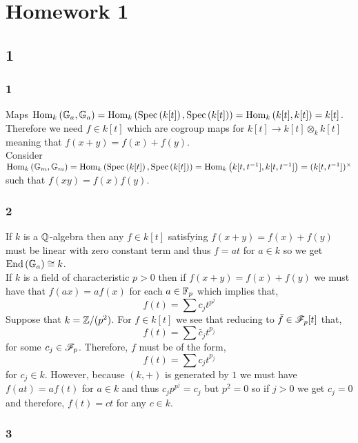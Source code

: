 \documentclass[12pt]{article}
\begin{document}
\section{Homework 1}

\tableofcontents

\subsection{1}

\subsubsection{1}

Maps $\mathrm{Hom}_{k} \left( \mathbb{G}_a, \mathbb{G}_a \right) = \mathrm{Hom}_{k} \left( \mathrm{Spec}\left( k[t] \right), \mathrm{Spec}\left( k[t] \right) \right) = \mathrm{Hom}_{k} \left( k[t], k[t] \right) = k[t]$. Therefore we need $f \in k[t]$ which are cogroup maps for $k[t] \to k[t] \otimes_k k[t]$ meaning that $f(x + y) = f(x) + f(y)$. 
\bigskip\\
Consider $\mathrm{Hom}_{k} \left( \mathbb{G}_m, \mathbb{G}_m \right) = \mathrm{Hom}_{k} \left( \mathrm{Spec}\left( k[t] \right), \mathrm{Spec}\left( k[t] \right) \right) = \mathrm{Hom}_{k} \left( k[t,t^{-1}], k[t,t^{-1}] \right) = (k[t, t^{-1}])^\times$ such that $f(xy) = f(x) f(y)$.

\subsubsection{2}

If $k$ is a $\mathbb{Q}$-algebra then any $f \in k[t]$ satisfying $f(x + y) = f(x) + f(y)$ must be linear with zero constant term and thus $f = a t$ for $a \in k$ so we get $\mathrm{End}\left( \mathbb{G}_a \right) \cong k$. 
\bigskip\\
If $k$ is a field of characteristic $p > 0$ then if $f(x+y) = f(x) + f(y)$ we must have that $f(ax) = a f(x)$ for each $a \in \mathbb{F}_p$ which implies that,
\[ f(t) = \sum c_j t^{p^j} \]
Suppose that $k = \mathbb{Z} / (p^2)$. For $f \in k[t]$ we see that reducing to $\bar{f} \in \mathscr{F}_p[t]$ that,
\[ f(t) = \sum \bar{c}_j t^{p_j} \]
for some $c_j \in \mathscr{F}_p$. Therefore, $f$ must be of the form,
\[ f(t) = \sum c_j t^{p_j} \]
for $c_j \in k$. However, because $(k, +)$ is generated by $1$ we must have $f(at) = a f(t)$ for $a \in k$ and thus $c_j p^{p^j} = c_j$ but $p^2 = 0$ so if $j > 0$ we get $c_j = 0$ and therefore, $f(t) = c t$ for any $c \in k$.

\subsubsection{3}
\end{document}
